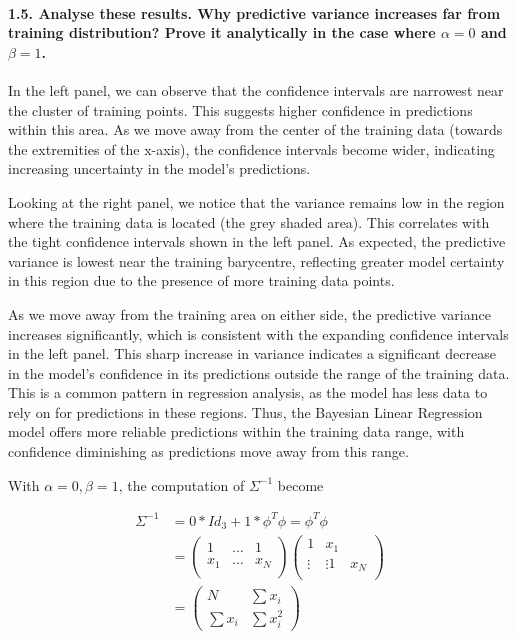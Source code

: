 \paragraph*{1.5. Analyse these results. Why predictive variance increases far from training distribution? Prove it analytically in the case where $\alpha=0$ and $\beta=1$.}

In the left panel, we can observe that the confidence intervals are narrowest near the cluster of training points. This suggests higher confidence in predictions within this area. As we move away from the center of the training data (towards the extremities of the x-axis), the confidence intervals become wider, indicating increasing uncertainty in the model's predictions.

Looking at the right panel, we notice that the variance remains low in the region where the training data is located (the grey shaded area). This correlates with the tight confidence intervals shown in the left panel. As expected, the predictive variance is lowest near the training barycentre, reflecting greater model certainty in this region due to the presence of more training data points.

As we move away from the training area on either side, the predictive variance increases significantly, which is consistent with the expanding confidence intervals in the left panel. This sharp increase in variance indicates a significant decrease in the model's confidence in its predictions outside the range of the training data. This is a common pattern in regression analysis, as the model has less data to rely on for predictions in these regions. Thus, the Bayesian Linear Regression model offers more reliable predictions within the training data range, with confidence diminishing as predictions move away from this range.\newline

With $\alpha = 0, \beta = 1$, the computation of $\Sigma^{-1}$ become 

\begin{align*}
    \Sigma ^{-1} 
        &= 0*Id_3 + 1* \phi ^T \phi = \phi ^T \phi \\ 
        &= \begin{pmatrix}
            1 & \dots & 1 \\
            x_1 & \dots & x_N \\
        \end{pmatrix} \begin{pmatrix}
            1 & x_1 \\
            \vdots & \vdots 
            1 & x_N \\
        \end{pmatrix} \\
        &= \begin{pmatrix}
            N & \sum x_i \\
            \sum x_i & \sum x_i^2
        \end{pmatrix}
\end{align*}

